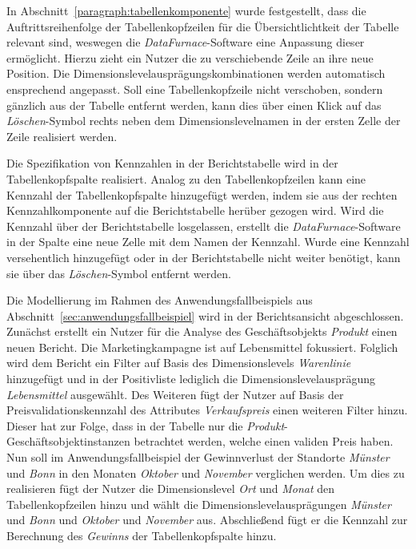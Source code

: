 \documentclass[
  language=german, %
  type=bachelor,%
  ngerman
]{isthesis}
\begin{document}
\begin{content}
  In Abschnitt~\ref{paragraph:tabellenkomponente} wurde festgestellt, dass die
  Auftrittsreihenfolge der Tabellenkopfzeilen für die Übersichtlichtkeit der
  Tabelle relevant sind, weswegen die \textit{DataFurnace}-Software eine Anpassung
  dieser ermöglicht. Hierzu zieht ein Nutzer die zu
  verschiebende Zeile an ihre neue Position. Die
  Dimensionslevelausprägungskombinationen werden automatisch ensprechend
  angepasst. Soll eine Tabellenkopfzeile nicht verschoben, sondern gänzlich aus
  der Tabelle entfernt werden, kann dies über einen Klick auf das
  \textit{Löschen}-Symbol rechts neben dem Dimensionslevelnamen in der ersten
  Zelle der Zeile realisiert werden.

  Die Spezifikation von Kennzahlen in der Berichtstabelle wird in der
  Tabellenkopfspalte realisiert. Analog zu den Tabellenkopfzeilen kann eine
  Kennzahl der Tabellenkopfspalte hinzugefügt werden, indem sie aus der rechten
  Kennzahlkomponente auf die Berichtstabelle herüber gezogen wird. Wird die
  Kennzahl über der Berichtstabelle losgelassen, erstellt die
  \textit{DataFurnace}-Software in der Spalte eine neue Zelle mit dem Namen der
  Kennzahl. Wurde eine Kennzahl versehentlich hinzugefügt oder in der
  Berichtstabelle nicht weiter benötigt, kann sie über das
  \textit{Löschen}-Symbol entfernt werden.

  Die Modellierung im Rahmen des Anwendungsfallbeispiels aus
  Abschnitt~\ref{sec:anwendungsfallbeispiel} wird in der Berichtsansicht
  abgeschlossen. Zunächst erstellt ein Nutzer für die Analyse des
  Geschäftsobjekts \textit{Produkt} einen neuen Bericht. Die Marketingkampagne
  ist auf Lebensmittel fokussiert. Folglich wird dem Bericht ein Filter auf
  Basis des Dimensionslevels \textit{Warenlinie} hinzugefügt und in der
  Positivliste lediglich die Dimensionslevelausprägung \textit{Lebensmittel}
  ausgewählt. Des Weiteren fügt der Nutzer auf Basis der
  Preisvalidationskennzahl des Attributes \textit{Verkaufspreis} einen weiteren
  Filter hinzu. Dieser hat zur Folge, dass in der Tabelle nur die
  \textit{Produkt}-Geschäftsobjektinstanzen betrachtet werden, welche einen
  validen Preis haben. Nun soll im Anwendungsfallbeispiel der Gewinnverlust der
  Standorte \textit{Münster} und \textit{Bonn} in den Monaten \textit{Oktober}
  und \textit{November} verglichen werden. Um dies zu realisieren fügt der
  Nutzer die Dimensionslevel \textit{Ort} und \textit{Monat} den
  Tabellenkopfzeilen hinzu und wählt die Dimensionslevelausprägungen
  \textit{Münster} und \textit{Bonn} und \textit{Oktober} und \textit{November}
  aus. Abschließend fügt er die Kennzahl zur Berechnung des \textit{Gewinns}
  der Tabellenkopfspalte hinzu.  


\end{content}
\end{document}
